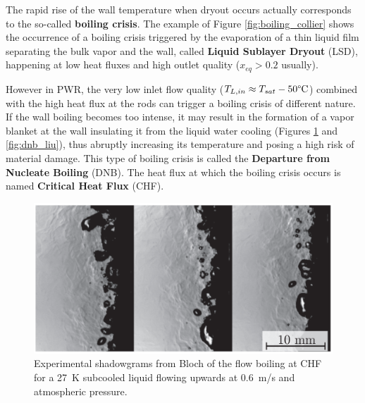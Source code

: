 The rapid rise of the wall temperature when dryout occurs actually corresponds to the so-called \textbf{boiling crisis}. The example of Figure \ref{fig:boiling_collier} shows the occurrence of a boiling crisis triggered by the evaporation of a thin liquid film separating the bulk vapor and the wall, called \textbf{Liquid Sublayer Dryout} (LSD), happening at low heat fluxes and high outlet quality ($x_{eq} >0.2$ usually). 

\npar

However in PWR, the very low inlet flow quality ($T_{L,in}\approx T_{sat}-50\degree\mathrm{C}$) combined with the high heat flux at the rods can trigger a boiling crisis of different nature. If the wall boiling becomes too intense, it may result in the formation of a vapor blanket at the wall insulating it from the liquid water cooling (Figures \ref{fig:dnb_bloch} and \ref{fig:dnb_liu}), thus abruptly increasing its temperature and posing a high risk of material damage. This type of boiling crisis is called the \textbf{Departure from Nucleate Boiling} (DNB). The heat flux at which the boiling crisis occurs is named \textbf{Critical Heat Flux} (CHF).


\begin{figure}[!h]
\centering
\includegraphics[width=0.5\linewidth]{img/intro/dnb_bloch.png}
\caption{Experimental shadowgrams from Bloch \etal \cite{bloch_phenomenological_2013} of the flow boiling at CHF for a 27\ K subcooled liquid flowing upwards at 0.6\ m/s and atmospheric pressure.}
\label{fig:dnb_bloch}
\end{figure}

